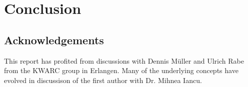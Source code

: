 \section{Conclusion}\label{sec:concl}

\subsection*{Acknowledgements}
This report has profited from discussions with Dennis M\"uller and Ulrich Rabe from the
KWARC group in Erlangen. Many of the underlying concepts have evolved in discussison of
the first author with Dr. Mihnea Iancu.


